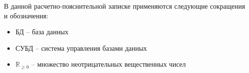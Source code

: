 
В данной расчетно-пояснительной записке применяются следующие сокращения и обозначения:
\begin{itemize}[label=]
	\item БД -- база данных
	\item СУБД -- система управления базами данных
	\item $\mathbb{R}_{\ge 0}$ -- множество неотрицательных вещественных чисел
	
\end{itemize}

\clearpage